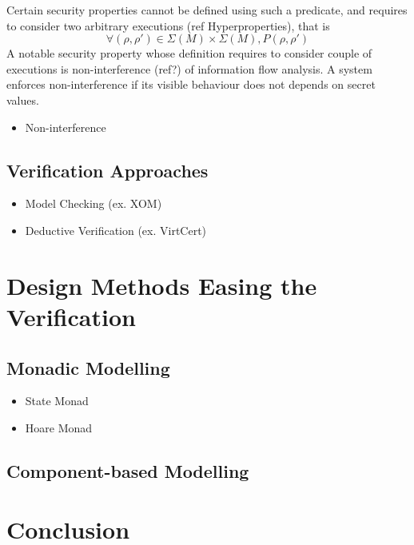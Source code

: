 Certain security properties cannot be defined using such a predicate, and
requires to consider two arbitrary executions (ref Hyperproperties), that is
%
\[
  \forall (\rho, \rho') \in \Sigma(M) \times \Sigma(M), P(\rho, \rho')
\]
%
A notable security property whose definition requires to consider couple of
executions is non-interference (ref?) of information flow analysis.
%
A system enforces non-interference if its visible behaviour does not depends on
secret values.

\begin{itemize}
\item Non-interference
\end{itemize}

\subsection{Verification Approaches}
\label{subsec:state:approaches}

\begin{itemize}
\item Model Checking (ex. XOM)
\item Deductive Verification (ex. VirtCert)
\end{itemize}

\section{Design Methods Easing the Verification}

\subsection{Monadic Modelling}

\begin{itemize}
\item State Monad
\item Hoare Monad
\end{itemize}

\subsection{Component-based Modelling}

\section{Conclusion}

\newpage

